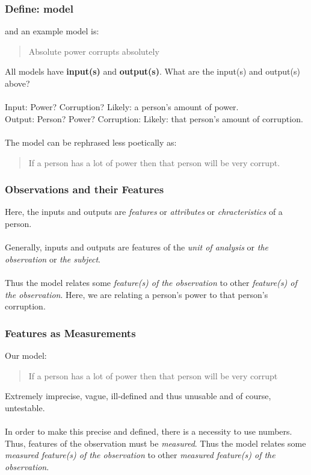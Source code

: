 \documentclass[slides]{beamer} %
\begin{document}
\begin{frame}\frametitle{Define: model}

 and an example model is:

\begin{quotation}
Absolute power corrupts absolutely
\end{quotation}

All models have \textbf{input(s)} and \textbf{output(s)}. What are the input(s) and output(s) above? \\~\\

Input: Power? Corruption? Likely: a person's amount of power. \\
Output: Person? Power? Corruption: Likely: that person's amount of corruption.\\~\\

The model can be rephrased less poetically as:

\begin{quotation}
If a person has a lot of power then that person will be very corrupt.
\end{quotation}

\end{frame}


\begin{frame}\frametitle{Observations and their Features}

\small
Here, the inputs and outputs are \textit{features} or \textit{attributes} or \textit{chracteristics} of a person. \\~\\

Generally, inputs and outputs are features of the \textit{unit of analysis} or \textit{the observation} or \textit{the subject}.  \\~\\

Thus the model relates some \textit{feature(s) of the observation} to other \textit{feature(s) of the observation}. Here, we are relating a person's power to that person's corruption.
\end{frame}

\begin{frame}\frametitle{Features as Measurements}
Our model:

\begin{quotation}
If a person has a lot of power then that person will be very corrupt
\end{quotation}

Extremely imprecise, vague, ill-defined and thus unusable and of course, untestable. \\~\\

In order to make this precise and defined, there is a necessity to use numbers. Thus, features of the observation must be \textit{measured}. Thus the model relates some \textit{measured feature(s) of the observation} to other \textit{measured feature(s) of the observation}.  
	
\end{frame}
\end{document}

